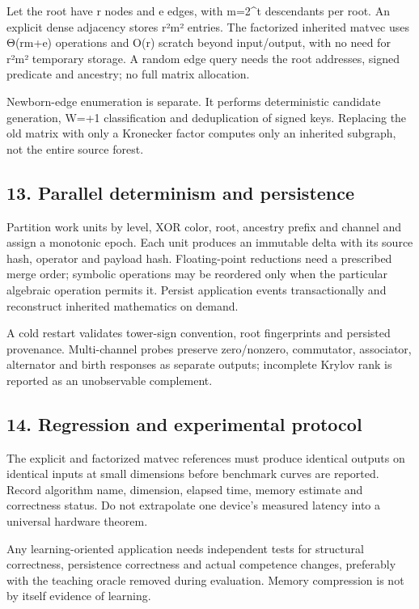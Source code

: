 \documentclass[
  10pt,
]{article}
\begin{document}
Let the root have r nodes and e edges, with m=2\^{}t descendants per
root. An explicit dense adjacency stores r²m² entries. The factorized
inherited matvec uses Θ(rm+e) operations and O(r) scratch beyond
input/output, with no need for r²m² temporary storage. A random edge
query needs the root addresses, signed predicate and ancestry; no full
matrix allocation.

Newborn-edge enumeration is separate. It performs deterministic
candidate generation, W=+1 classification and deduplication of signed
keys. Replacing the old matrix with only a Kronecker factor computes
only an inherited subgraph, not the entire source forest.

\subsection{13. Parallel determinism and
persistence}\label{parallel-determinism-and-persistence}

Partition work units by level, XOR color, root, ancestry prefix and
channel and assign a monotonic epoch. Each unit produces an immutable
delta with its source hash, operator and payload hash. Floating-point
reductions need a prescribed merge order; symbolic operations may be
reordered only when the particular algebraic operation permits it.
Persist application events transactionally and reconstruct inherited
mathematics on demand.

A cold restart validates tower-sign convention, root fingerprints and
persisted provenance. Multi-channel probes preserve zero/nonzero,
commutator, associator, alternator and birth responses as separate
outputs; incomplete Krylov rank is reported as an unobservable
complement.

\subsection{14. Regression and experimental
protocol}\label{regression-and-experimental-protocol}

The explicit and factorized matvec references must produce identical
outputs on identical inputs at small dimensions before benchmark curves
are reported. Record algorithm name, dimension, elapsed time, memory
estimate and correctness status. Do not extrapolate one device's
measured latency into a universal hardware theorem.

Any learning-oriented application needs independent tests for structural
correctness, persistence correctness and actual competence changes,
preferably with the teaching oracle removed during evaluation. Memory
compression is not by itself evidence of learning.
\end{document}
